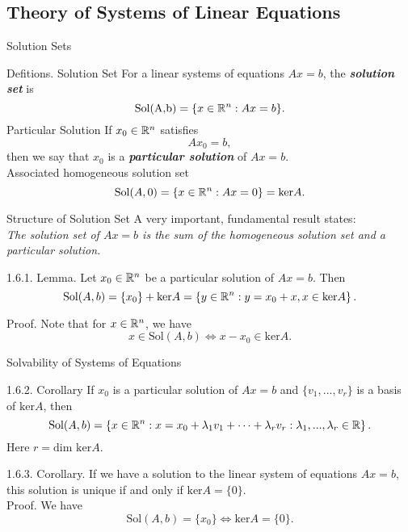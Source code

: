 \documentclass[hyperref={pdfpagelabels=true}]{beamer}
\newcommand{\highlightg}[1]{\textcolor[rgb]{0.1,0.5,0.3}{\emph{\textbf{#1}}}}
\newcommand{\structb}[1]{\textcolor[rgb]{0.2,0.2,0.7}{#1}}
\newcommand{\<}{\langle}
\renewcommand{\>}{\rangle}
\newenvironment{shrinkeq}[1]%
{ \bgroup
  \addtolength\abovedisplayshortskip{#1}
  \addtolength\abovedisplayskip{#1}
  \addtolength\belowdisplayshortskip{#1}
  \addtolength\belowdisplayskip{#1}}
{\egroup\ignorespacesafterend}
\begin{document}
\subsection{Theory of Systems of Linear Equations}
\begin{frame}{Solution Sets}
    \begin{block}{Defitions.}
        \structb{Solution Set} For a linear systems of equations $Ax = b$, the \highlightg{solution set} is 
        \[\text{Sol(A,b)} = \{x \in \mathbb{R}^{n}:Ax = b\}.\]
        \structb{Particular Solution} If $x_{0} \in \mathbb{R}^{n}$ satisfies
        \[Ax_{0} = b ,\]
        then we say that $x_{0}$ is a \highlightg{particular solution} of $Ax = b$.\\
        \structb{Associated homogeneous solution set} 
        \[\text{Sol}(A,0) = \{x \in \mathbb{R}^{n}:Ax = 0\} = \text{ker}A.\]
    \end{block}
\end{frame}
\begin{frame}{Structure of Solution Set}
    A very important, fundamental result states:\\
    \textit{The solution set of $Ax = b$ is the sum of the homogeneous solution set and a particular solution.}
    \begin{block}{1.6.1. Lemma.}
        Let $x_{0} \in \mathbb{R}^{n}$ be a particular solution of $Ax = b$. Then
        \begin{shrinkeq}{-0.3em}
        \[\text{Sol}(A,b) = \{x_{0}\}+\text{ker}A = \left\{y \in \mathbb{R}^{n}:y = x_{0}+x,x \in \text{ker}A \right\}.\]
        \end{shrinkeq}
    \end{block}
    \begin{block}{Proof.}
        Note that for $x \in \mathbb{R}^{n}$, we have 
        \[x \in \text{Sol}(A,b) \Leftrightarrow x-x_{0} \in \text{ker}A.\]
    \end{block}
\end{frame}
\begin{frame}{Solvability of Systems of Equations}
    \begin{block}{1.6.2. Corollary}
        If $x_{0}$ is a particular solution of $Ax = b$ and $\{v_{1},...,v_{r}\}$ is a basis of $\text{ker}A$, then
        \[\text{Sol}(A,b) = \left\{x \in \mathbb{R}^{n}:x = x_{0}+\lambda_{1}v_{1}+\cdots+\lambda_{r}v_{r}:\lambda_{1},...,\lambda_{r} \in \mathbb{R}\right\}.\]
        Here $r = \text{dim ker} A$.
    \end{block}
    \begin{block}{1.6.3. Corollary.} 
        If we have a solution to the linear system of equations $Ax = b$, this solution is unique if and only if $\text{ker}A = \{0\}.$\\
        \structb{Proof.} We have
        \[\text{Sol}(A,b) = \{x_{0}\} \Leftrightarrow \text{ker}A = \{0\}.\]
    \end{block}
\end{frame}
\end{document}

